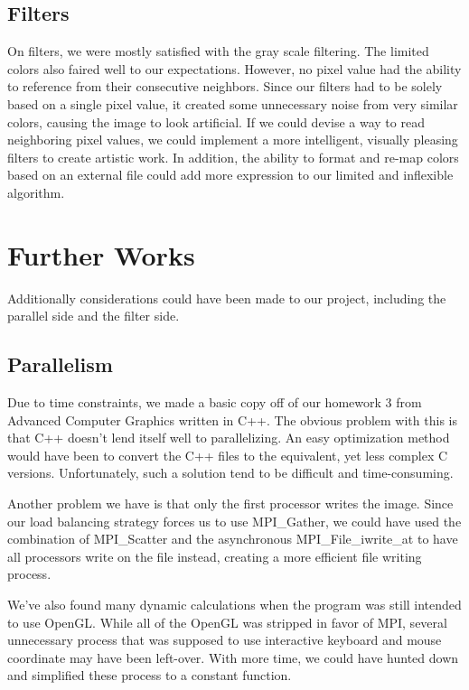 \documentclass{acmsiggraph}
\begin{document}
\subsection{Filters}
On filters, we were mostly satisfied with the gray scale filtering.  The
limited colors also faired well to our expectations. However, no pixel value had
the ability to reference from their consecutive neighbors.  Since our filters had
to be solely based on a single pixel value, it created some unnecessary noise from
very similar colors, causing the image to look artificial.  If we could devise a
way to read neighboring pixel values, we could implement a more intelligent,
visually pleasing filters to create artistic work.  In addition, the ability
to format and re-map colors based on an external file could add more expression
to our limited and inflexible algorithm.


\section{Further Works}
Additionally considerations could have been made to our project, including the
parallel side and the filter side.

\subsection{Parallelism}
Due to time constraints, we made a basic copy off of our homework 3 from
Advanced Computer Graphics written in C++.  The obvious problem with this is
that C++ doesn't lend itself well to parallelizing.  An easy optimization method
would have been to convert the C++ files to the equivalent, yet less complex C
versions.  Unfortunately, such a solution tend to be difficult and time-consuming.

Another problem we have is that only the first processor writes the image.  Since our load
balancing strategy forces us to use MPI_Gather, we could have used the combination
of MPI_Scatter and the asynchronous MPI_File_iwrite_at to have all processors
write on the file instead, creating a more efficient file writing process.

We've also found many dynamic calculations when the program was still
intended to use OpenGL. While all of the OpenGL was stripped in favor of MPI,
several unnecessary process that was supposed to use interactive keyboard and mouse
coordinate may have been left-over.  With more time, we could have hunted down and
simplified these process to a constant function.
\end{document}
